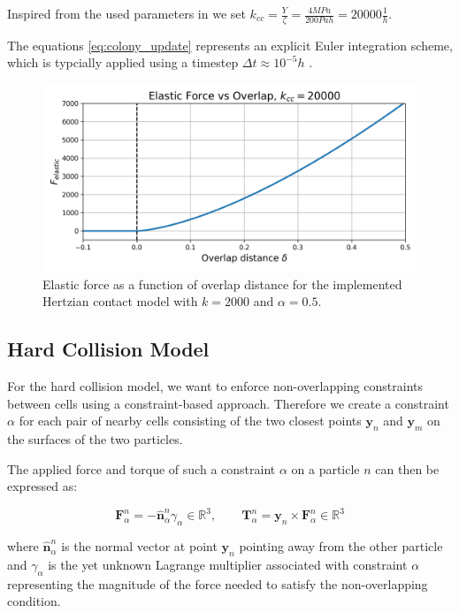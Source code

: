 \documentclass[conference]{IEEEtran}
\begin{document}
Inspired from the used parameters in \cite{You2018} we set $k_{cc} = \frac{Y}{\zeta} = \frac{4 MPa}{200 Pa h} = 20000 \frac{1}{h}$.


The equations \autoref{eq:colony_update} represents an explicit Euler integration scheme, which is typcially applied using  a timestep $\Delta t \approx 10^{-5} h$ \cite{Khan_2024}\cite{You2018}\cite{Blanchard2015}.


\begin{figure}[H]
    \centering
    \includegraphics[width=\linewidth]{figures/hertzian_contact_model.png}
    \caption{Elastic force as a function of overlap distance for the implemented Hertzian contact model with $k=2000$ and $\alpha=0.5$.}
    \label{fig:hertzian_contact_model}
\end{figure}

\newpage
\subsection{Hard Collision Model}


For the hard collision model, we want to enforce non-overlapping constraints between cells using a constraint-based approach. Therefore we create a constraint $\alpha$ for each pair of nearby cells consisting of the two closest points $\mathbf{y}_n$ and $\mathbf{y}_m$ on the surfaces of the two particles.

The applied force and torque of such a constraint $\alpha$ on a particle $n$ can then be expressed as:

\begin{equation}
    \mathbf{F}_\alpha^n = - \hat{\mathbf{n}}_\alpha ^n \gamma_\alpha \in \mathbb{R}^3, \qquad \mathbf{T}_\alpha^n = \mathbf{y}_n \times \mathbf{F}_\alpha^n \in \mathbb{R}^3
\end{equation}
\label{eq:constraint_force}

where $\hat{\mathbf{n}}_\alpha ^n$ is the normal vector at point $\mathbf{y}_n$ pointing away from the other particle and $\gamma_\alpha$ is the yet unknown Lagrange multiplier associated with constraint $\alpha$ representing the magnitude of the force needed to satisfy the non-overlapping condition.
\end{document}

